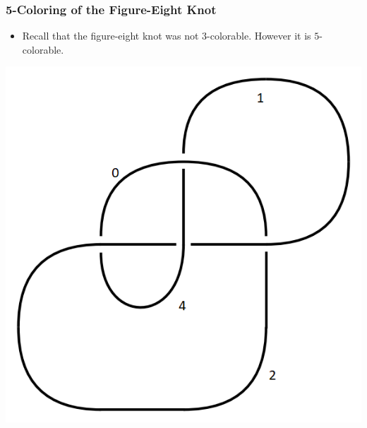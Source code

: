 \documentclass{beamer}
\begin{document}
\begin{frame}
  \frametitle{5-Coloring of the Figure-Eight Knot}
  \begin{itemize}
  \item Recall that the figure-eight knot was not $3$-colorable.
    However it is $5$-colorable.
  \end{itemize}
  \begin{center}
    \includegraphics[scale=.4]{figure-eight-c}
  \end{center}
\end{frame}
\end{document}
